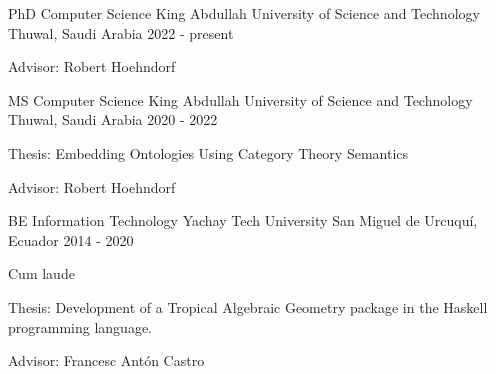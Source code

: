 

\begin{cventries}

  \cventry
  {PhD Computer Science} %
  {King Abdullah University of Science and Technology} %
  {Thuwal, Saudi Arabia} %
  {2022 - present} %
    {
      \begin{cvitems} %
      \item {Advisor: Robert Hoehndorf}
      \end{cvitems}
    }

  \cventry
  {MS Computer Science} %
  {King Abdullah University of Science and Technology} %
  {Thuwal, Saudi Arabia} %
  {2020 - 2022} %
    {
      \begin{cvitems} %
      \item {Thesis: Embedding Ontologies Using Category Theory Semantics}
      \item {Advisor: Robert Hoehndorf}
      \end{cvitems}
    }

  \cventry
  {BE Information Technology} %
  {Yachay Tech University} %
  {San Miguel de Urcuquí, Ecuador} %
    {2014 - 2020} %
    {
      \begin{cvitems} %
      \item {Cum laude}
      \item {Thesis: Development of a Tropical Algebraic Geometry package in the Haskell programming language.}
      \item {Advisor: Francesc Antón Castro}
      \end{cvitems}
    }

\end{cventries}
